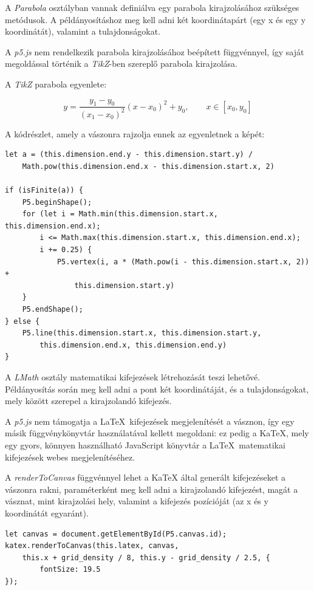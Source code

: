 A \textit{Parabola} osztályban vannak definiálva egy parabola kirajzolásához szükséges metódusok. A példányosításhoz meg kell adni két koordinátapárt (egy x és egy y koordinátát), valamint a tulajdonságokat.

A \textit{p5.js} nem rendelkezik parabola kirajzolásához beépített függvénnyel, így saját megoldással történik a \textit{TikZ}-ben szereplő parabola kirajzolása. 

A \textit{TikZ} parabola egyenlete: 

$$\displaystyle y = \frac{y_1 - y_0}{(x_1 - x_0)^2}(x - x_0)^2 + y_0, \qquad x\in[x_0, y_0]$$

A kódrészlet, amely a vászonra rajzolja ennek az egyenletnek a képét:

\begin{lstlisting}[style=es6, morekeywords={P5}]
let a = (this.dimension.end.y - this.dimension.start.y) / 
    Math.pow(this.dimension.end.x - this.dimension.start.x, 2)
    
if (isFinite(a)) {
	P5.beginShape();
	for (let i = Math.min(this.dimension.start.x, this.dimension.end.x); 
	    i <= Math.max(this.dimension.start.x, this.dimension.end.x); 
	    i += 0.25) {
		    P5.vertex(i, a * (Math.pow(i - this.dimension.start.x, 2)) +
		        this.dimension.start.y)
	}
	P5.endShape();
} else {
	P5.line(this.dimension.start.x, this.dimension.start.y, 
	    this.dimension.end.x, this.dimension.end.y)
}
\end{lstlisting}


A \textit{LMath} osztály matematikai kifejezések létrehozását teszi lehetővé. Példányosítás során meg kell adni a pont két koordinátáját, és a tulajdonságokat, mely között szerepel a kirajzolandó kifejezés. 

A \textit{p5.js} nem támogatja a \LaTeX\ kifejezések megjelenítését a vásznon, így egy másik függvénykönyvtár használatával kellett megoldani: ez pedig a KaTeX{\cite{katex}}, mely egy gyors, könnyen használható JavaScript könyvtár a \LaTeX\ matematikai kifejezések webes megjelenítéséhez.

A \textit{renderToCanvas} függvénnyel lehet a KaTeX által generált kifejezéseket a vászonra rakni, paraméterként meg kell adni a kirajzolandó kifejezést, magát a vásznat, mint kirajzolási hely, valamint a kifejezés pozícióját (az x és y koordinátát egyaránt).

\begin{lstlisting}[style=es6, morekeywords={document, P5, katex}]
let canvas = document.getElementById(P5.canvas.id);
katex.renderToCanvas(this.latex, canvas, 
    this.x + grid_density / 8, this.y - grid_density / 2.5, {
	    fontSize: 19.5
});
\end{lstlisting}


